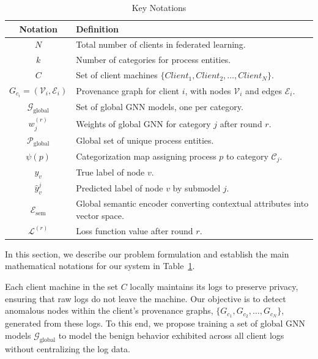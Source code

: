   \begin{table}[!t]
    \centering
    \scriptsize
    \caption{Key Notations}
    \label{tab:keynotations}
    \begin{tabular}{|c|p{6cm}|}
    \hline
    \textbf{Notation} & \textbf{Definition} \\ \hline
    \( N \) & Total number of clients in federated learning. \\ \hline
    \( k \) & Number of categories for process entities. \\ \hline
    \( C \) & Set of client machines \(\{Client_1, Client_2, \ldots, Client_N\}\). \\ \hline
    \( G_{c_i} = (\mathcal{V}_i, \mathcal{E}_i) \) & Provenance graph for client \( i \), with nodes \( \mathcal{V}_i \) and edges \( \mathcal{E}_i \). \\ \hline
    \( \mathcal{G}_{\text{global}} \) & Set of global GNN models, one per category. \\ \hline
    \( w_j^{(r)} \) & Weights of global GNN for category \( j \) after round \( r \). \\ \hline
    \( \mathcal{P}_{\text{global}} \) & Global set of unique process entities. \\ \hline
    \( \psi(p) \) & Categorization map assigning process \( p \) to category \( \mathcal{C}_j \). \\ \hline
    \( y_v \) & True label of node \( v \). \\ \hline
    \( \hat{y}_v^j \) & Predicted label of node \( v \) by submodel \( j \). \\ \hline
    \( \mathcal{E}_{\text{sem}} \) & Global semantic encoder converting contextual attributes into vector space. \\ \hline
    \( \mathcal{L}^{(r)} \) & Loss function value after round \( r \). \\ \hline
    \end{tabular}
  \end{table}

In this section, we describe our problem formulation and establish the main mathematical notations for our system in Table~\ref{tab:keynotations}.

Each client machine in the set \( C \) locally maintains its logs to preserve privacy, ensuring that raw logs do not leave the machine. Our objective is to detect anomalous nodes within the client's provenance graphs, \( \{G_{c_1}, G_{c_2}, \ldots, G_{c_N}\} \), generated from these logs. To this end, we propose training a set of global GNN models \( \mathcal{G}_{\text{global}} \) to model the benign behavior exhibited across all client logs without centralizing the log data.


